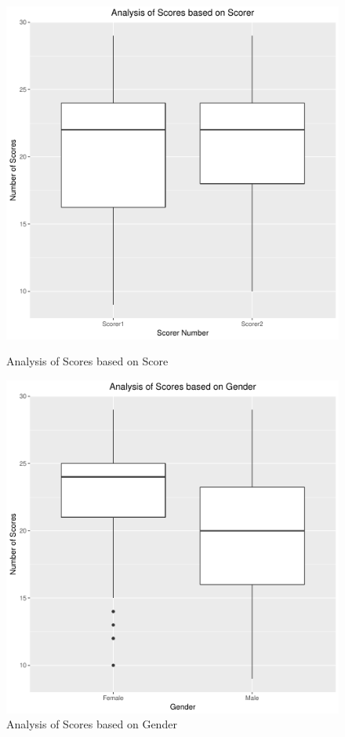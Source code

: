 \documentclass[12pt,epsf]{report}
\begin{document}
\\
\begin{figure}[!htb]
	\begin{minipage}[c]{0.5\linewidth}
	\includegraphics[width=\linewidth]{ScorerVsScore.pdf}
	\caption{Analysis of Scores based on Score }
	\end{minipage}
	\hfill
	\begin{minipage}[c]{0.5\linewidth}
	\includegraphics[width=\linewidth]{GenderVsScore.pdf}
	\caption{Analysis of Scores based on Gender}
	\end{minipage}
\end{figure}
\end{document}
